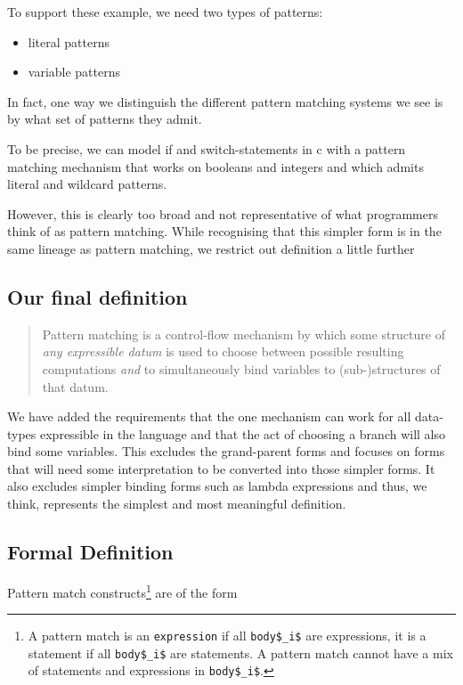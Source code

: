 \documentclass[acmsmall]{acmart}
\begin{document}
To support these example, we need two types of patterns:
\begin{itemize}
    \item literal patterns
    \item variable patterns
\end{itemize}

In fact, one way we distinguish the different pattern matching systems we see is by what set of patterns they admit.

To be precise, we can model if and switch-statements in c with a pattern matching mechanism that works on booleans and integers and which admits literal and wildcard patterns.

However, this is clearly too broad and not representative of what programmers think of as pattern matching. While recognising that this simpler form is in the same lineage as pattern matching, we restrict out definition a little further

\subsection{Our final definition}

\begin{quote}
     Pattern matching is a control-flow mechanism by which some structure of \emph{any expressible datum} is used to choose between possible resulting computations \emph{and} to simultaneously bind variables to (sub-)structures of that datum.
\end{quote}

We have added the requirements that the one mechanism can work for all data-types expressible in the language and that the act of choosing a branch will also bind some variables. This excludes the grand-parent forms and focuses on forms that will need some interpretation to be converted into those simpler forms. It also excludes simpler binding forms such as lambda expressions and thus, we think, represents the simplest and most meaningful definition.


\subsection{Formal Definition}
\label{sec:defn}

Pattern match constructs\footnote{A pattern match is an \lstinline{expression} if all \lstinline!body$_i$! are expressions, it is a statement if all \lstinline!body$_i$! are statements.  A pattern match cannot have a mix of statements and expressions in \lstinline!body$_i$!.}
 are of the form
\end{document}
